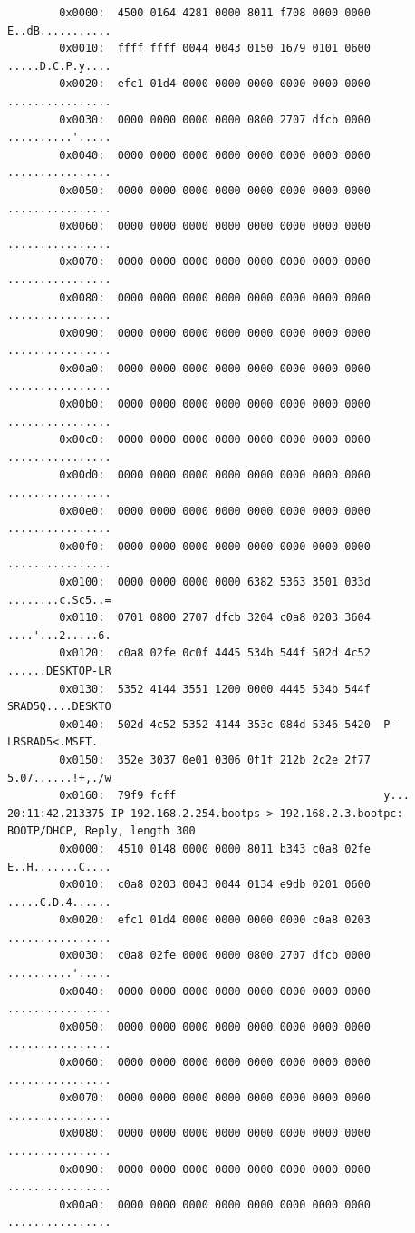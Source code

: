 \documentclass{mwart} %
\begin{document}
\begin{footnotesize}
\begin{verbatim}
        0x0000:  4500 0164 4281 0000 8011 f708 0000 0000  E..dB...........
        0x0010:  ffff ffff 0044 0043 0150 1679 0101 0600  .....D.C.P.y....
        0x0020:  efc1 01d4 0000 0000 0000 0000 0000 0000  ................
        0x0030:  0000 0000 0000 0000 0800 2707 dfcb 0000  ..........'.....
        0x0040:  0000 0000 0000 0000 0000 0000 0000 0000  ................
        0x0050:  0000 0000 0000 0000 0000 0000 0000 0000  ................
        0x0060:  0000 0000 0000 0000 0000 0000 0000 0000  ................
        0x0070:  0000 0000 0000 0000 0000 0000 0000 0000  ................
        0x0080:  0000 0000 0000 0000 0000 0000 0000 0000  ................
        0x0090:  0000 0000 0000 0000 0000 0000 0000 0000  ................
        0x00a0:  0000 0000 0000 0000 0000 0000 0000 0000  ................
        0x00b0:  0000 0000 0000 0000 0000 0000 0000 0000  ................
        0x00c0:  0000 0000 0000 0000 0000 0000 0000 0000  ................
        0x00d0:  0000 0000 0000 0000 0000 0000 0000 0000  ................
        0x00e0:  0000 0000 0000 0000 0000 0000 0000 0000  ................
        0x00f0:  0000 0000 0000 0000 0000 0000 0000 0000  ................
        0x0100:  0000 0000 0000 0000 6382 5363 3501 033d  ........c.Sc5..=
        0x0110:  0701 0800 2707 dfcb 3204 c0a8 0203 3604  ....'...2.....6.
        0x0120:  c0a8 02fe 0c0f 4445 534b 544f 502d 4c52  ......DESKTOP-LR
        0x0130:  5352 4144 3551 1200 0000 4445 534b 544f  SRAD5Q....DESKTO
        0x0140:  502d 4c52 5352 4144 353c 084d 5346 5420  P-LRSRAD5<.MSFT.
        0x0150:  352e 3037 0e01 0306 0f1f 212b 2c2e 2f77  5.07......!+,./w
        0x0160:  79f9 fcff                                y...
20:11:42.213375 IP 192.168.2.254.bootps > 192.168.2.3.bootpc: BOOTP/DHCP, Reply, length 300
        0x0000:  4510 0148 0000 0000 8011 b343 c0a8 02fe  E..H.......C....
        0x0010:  c0a8 0203 0043 0044 0134 e9db 0201 0600  .....C.D.4......
        0x0020:  efc1 01d4 0000 0000 0000 0000 c0a8 0203  ................
        0x0030:  c0a8 02fe 0000 0000 0800 2707 dfcb 0000  ..........'.....
        0x0040:  0000 0000 0000 0000 0000 0000 0000 0000  ................
        0x0050:  0000 0000 0000 0000 0000 0000 0000 0000  ................
        0x0060:  0000 0000 0000 0000 0000 0000 0000 0000  ................
        0x0070:  0000 0000 0000 0000 0000 0000 0000 0000  ................
        0x0080:  0000 0000 0000 0000 0000 0000 0000 0000  ................
        0x0090:  0000 0000 0000 0000 0000 0000 0000 0000  ................
        0x00a0:  0000 0000 0000 0000 0000 0000 0000 0000  ................

\end{verbatim}
\end{footnotesize}
\end{document}
